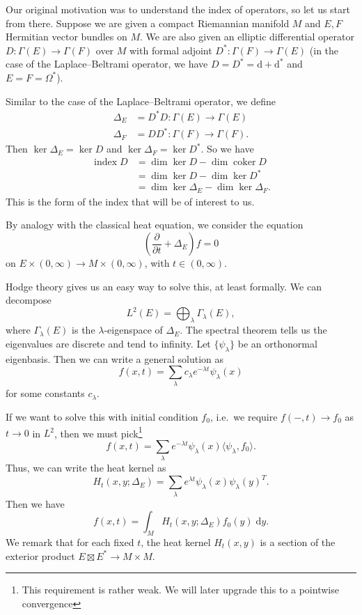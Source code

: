 \documentclass{shortart}
\theoremstyle{definition}
\newcommand\bra\langle
\newcommand\ket\rangle
\renewcommand\d{\mathrm{d}}
\DeclareMathOperator\coker{coker}
\DeclareMathOperator\idx{index}
\begin{document}
Our original motivation was to understand the index of operators, so let us start from there. Suppose we are given a compact Riemannian manifold $M$ and $E, F$ Hermitian vector bundles on $M$. We are also given an elliptic differential operator $D\colon \Gamma(E) \to \Gamma(F)$ over $M$ with formal adjoint $D^*\colon \Gamma(F) \to \Gamma(E)$ (in the case of the Laplace--Beltrami operator, we have $D = D^* = \d + \d^*$ and $E = F = \Omega^*$). 

Similar to the case of the Laplace--Beltrami operator, we define
\[
  \begin{aligned}
    \Delta_E &= D^* D \colon \Gamma(E) \to \Gamma(E)\\
    \Delta_F &= D D^*\colon \Gamma(F) \to \Gamma(F).
  \end{aligned}
\]
Then $\ker \Delta_E = \ker D$ and $\ker \Delta_F = \ker D^*$. So we have
\[
  \begin{aligned}
    \idx D &= \dim \ker D - \dim \coker D \\
    &= \dim \ker D - \dim \ker D^*\\
    &= \dim \ker \Delta_E - \dim \ker \Delta_F.
  \end{aligned}
\]
This is the form of the index that will be of interest to us.

By analogy with the classical heat equation, we consider the equation
\[
  \left(\frac{\partial}{\partial t} + \Delta_E\right) f = 0
\]
on $E \times (0, \infty) \to M \times (0, \infty)$, with $t \in (0, \infty)$.

Hodge theory gives us an easy way to solve this, at least formally. We can decompose
\[
  L^2(E) = \bigoplus_\lambda \Gamma_\lambda(E),
\]
where $\Gamma_\lambda(E)$ is the $\lambda$-eigenspace of $\Delta_E$. The spectral theorem tells us the eigenvalues are discrete and tend to infinity. Let $\{\psi_\lambda\}$ be an orthonormal eigenbasis. Then we can write a general solution as
\[
  f(x, t) = \sum_\lambda c_\lambda e^{-\lambda t} \psi_\lambda(x)
\]
for some constants $c_\lambda$.

If we want to solve this with initial condition $f_0$, i.e.\ we require $f(-, t) \to f_0$ as $t \to 0$ in $L^2$, then we must pick\footnote{This requirement is rather weak. We will later upgrade this to a pointwise convergence}
\[
  f(x, t) = \sum_\lambda e^{-\lambda t} \psi_\lambda(x) \bra \psi_\lambda, f_0\ket.
\]
Thus, we can write the heat kernel as
\[
  H_t(x, y; \Delta_E) = \sum_\lambda e^{\lambda t} \psi_\lambda(x) \psi_\lambda(y)^T.
\]
Then we have
\[
  f(x, t) = \int_M H_t(x, y; \Delta_E) f_0(y)\;\d y.
\]
We remark that for each fixed $t$, the heat kernel $H_t(x, y)$ is a section of the exterior product $E \boxtimes E^* \to M \times M$.
\end{document}
